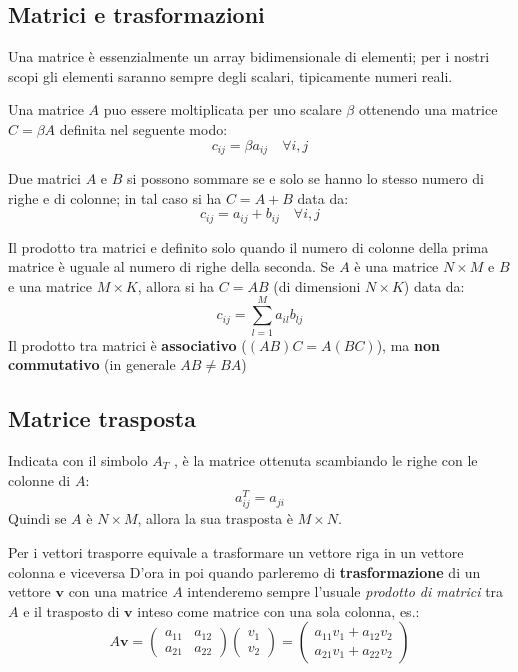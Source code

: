 \documentclass[a4paper, 10pt]{article}
\renewcommand{\vec}{\bm}
\begin{document}
	\subsection{Matrici e trasformazioni}
		Una matrice è essenzialmente un array bidimensionale di
		elementi; per i nostri scopi gli elementi saranno sempre degli
		scalari, tipicamente numeri reali.
		
		Una matrice $ A $ puo essere moltiplicata per uno scalare $ \beta $
		ottenendo una matrice $ C = \beta A $ definita nel seguente modo:
		\[
			c_{i j} = \beta a_{i j} \quad \forall i, j
		\]
		
		Due matrici $ A $ e $ B $ si possono sommare se e solo se hanno lo
		stesso numero di righe e di colonne; in tal caso si ha $ C = A + B $ data da:
		\[
			c_{i j} = a_{i j} + b_{i j} \quad \forall i, j
		\]
		
		Il prodotto tra matrici e definito solo quando il numero di
		colonne della prima matrice è uguale al numero di righe della
		seconda. Se $ A $ è una matrice $ N\times M $ e $ B $ e una matrice $ M\times K $, allora
		si ha $ C = AB $ (di dimensioni $ N\times K $) data da:
		\[
			c_{i j} = \sum_{l = 1}^{M} a_{i l} b_{l j}
		\]
		Il prodotto tra matrici è \textbf{associativo} ($ (AB)C = A(BC) $), ma \textbf{non commutativo} (in generale $ AB\neq BA $)
			
	\subsection{Matrice trasposta}
		Indicata con il simbolo $ A_T $ , è la matrice ottenuta scambiando le
		righe con le colonne di $ A $: 
		\[
			a_{i j}^T = a_{j i} 
		\] 
		Quindi se $ A $ è $ N\times M $, allora la sua trasposta è $ M\times N $.
		
		\noindent
		Per i vettori trasporre equivale a trasformare un vettore riga in
		un vettore colonna e viceversa
		D'ora in poi quando parleremo di \textbf{trasformazione} di un vettore
		$ \vec{v} $ con una matrice $ A $ intenderemo sempre l'usuale \textit{prodotto di
		matrici} tra $ A $ e il trasposto di $ \vec{v} $ inteso come matrice con una
		sola colonna, es.:
		\[
			A\vec{v} =
			\begin{pmatrix}
				a_{1 1} & a_{1 2} \\
				a_{2 1} & a_{2 2}
			\end{pmatrix}
			\begin{pmatrix}
				v_1 \\
				v_2
			\end{pmatrix}
			=
			\begin{pmatrix}
				a_{1 1}v_1 + a_{1 2}v_2 \\
				a_{2 1}v_1 + a_{2 2}v_2
			\end{pmatrix}
		\]
		
\end{document}
